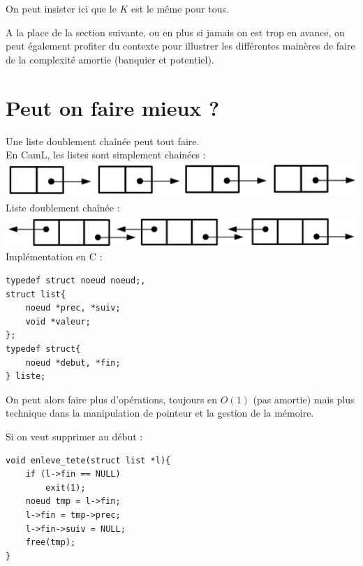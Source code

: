 \begin{com}
	On peut insister ici que le $K$ est le même pour tous.
\end{com}

\begin{com}
	A la place de la section suivante, ou en plus si jamais on est trop en avance, on peut également profiter du contexte pour illustrer les différentes mainères de faire de la complexité amortie (banquier et potentiel).
\end{com}

\section*{Peut on faire mieux ?}

Une liste doublement chaînée peut tout faire.\\

En CamL, les listes sont simplement chainées : \\
\includegraphics[width=\linewidth]{Developpements/implementation paps/simplement_chainee.png}\\

Liste doublement chaînée : \\
\includegraphics[width=\linewidth]{Developpements/implementation paps/doublement_chainee.png}\\

Implémentation en C :
\begin{lstlisting}
typedef struct noeud noeud;,
struct list{
    noeud *prec, *suiv;
    void *valeur;
};
typedef struct{
    noeud *debut, *fin;
} liste;
\end{lstlisting}
On peut alors faire plus d'opérations, toujours en $O(1)$ (pas amortie) mais plus technique dans la manipulation de pointeur et la gestion de la mémoire.

Si on veut supprimer au début :
\begin{lstlisting}
void enleve_tete(struct list *l){
    if (l->fin == NULL)
        exit(1);
    noeud tmp = l->fin;
    l->fin = tmp->prec;
    l->fin->suiv = NULL;
    free(tmp);
}
\end{lstlisting}

